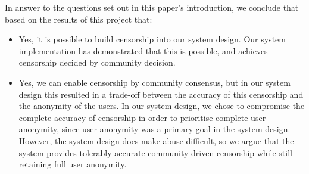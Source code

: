 In answer to the questions set out in this paper's introduction, we conclude that based on the
results of this project that:
\begin{itemize}
    \item Yes, it is possible to build censorship into our system design. Our system
        implementation has demonstrated that this is possible, and achieves censorship
        decided by community decision.
    \item Yes, we can enable censorship by community consensus, but in our system design
        this resulted in a trade-off between the accuracy of this censorship and the
        anonymity of the users. In our system design, we chose to compromise the complete
        accuracy of censorship in order to prioritise complete user anonymity, since user
        anonymity was a primary goal in the system design. However, the system design does
        make abuse difficult, so we argue that the system provides tolerably accurate
        community-driven censorship while still retaining full user anonymity.
\end{itemize}

